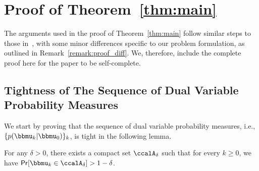 \section{Proof of Theorem~\ref{thm:main}}\label{appx:proof}
\allowdisplaybreaks

The arguments used in the proof of Theorem~\ref{thm:main} follow similar steps to those in~\cite{calvo2021state}, with some minor differences specific to our problem formulation, as outlined in Remark~\ref{remark:proof_diff}. We, therefore, include the complete proof here for the paper to be self-complete.%

\subsection{Tightness of The Sequence of Dual Variable Probability Measures}\label{appx:proof_tightness}
We start by proving that the sequence of dual variable probability measures, i.e., $\{p(\bbmu_k|\bbmu_0)\}_{k}$, is tight in the following lemma.

\begin{lemma}
For any $\delta > 0$, there exists a compact set $\ccalA_{\delta}$ such that for every $k \geq 0$, we have $\mathsf{Pr}[\bbmu_k \in \ccalA_{\delta}] > 1 - \delta$.
\end{lemma}

